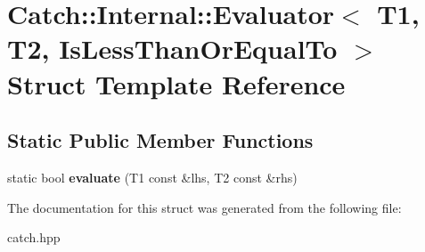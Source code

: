 \hypertarget{structCatch_1_1Internal_1_1Evaluator_3_01T1_00_01T2_00_01IsLessThanOrEqualTo_01_4}{}\section{Catch\+:\+:Internal\+:\+:Evaluator$<$ T1, T2, Is\+Less\+Than\+Or\+Equal\+To $>$ Struct Template Reference}
\label{structCatch_1_1Internal_1_1Evaluator_3_01T1_00_01T2_00_01IsLessThanOrEqualTo_01_4}
\subsection*{Static Public Member Functions}
\begin{DoxyCompactItemize}
\item 
\mbox{\label{structCatch_1_1Internal_1_1Evaluator_3_01T1_00_01T2_00_01IsLessThanOrEqualTo_01_4_adf269a597e4d82d69f29bcb516297b9b}} 
static bool {\bfseries evaluate} (T1 const \&lhs, T2 const \&rhs)
\end{DoxyCompactItemize}


The documentation for this struct was generated from the following file\+:\begin{DoxyCompactItemize}
\item 
catch.\+hpp\end{DoxyCompactItemize}
